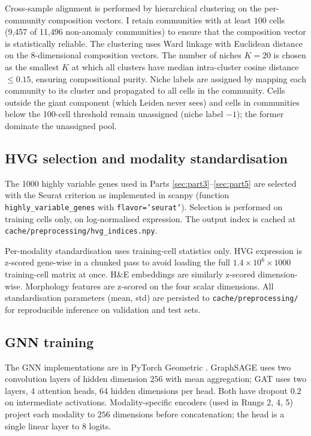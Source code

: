 Cross-sample alignment is performed by hierarchical clustering on the per-community composition vectors. I retain communities with at least $100$ cells (9{,}457 of 11{,}496 non-anomaly communities) to ensure that the composition vector is statistically reliable. The clustering uses Ward linkage \cite{murtagh2014ward} with Euclidean distance on the 8-dimensional composition vectors. The number of niches $K = 20$ is chosen as the smallest $K$ at which all clusters have median intra-cluster cosine distance $\leq 0.15$, ensuring compositional purity. Niche labels are assigned by mapping each community to its cluster and propagated to all cells in the community. Cells outside the giant component (which Leiden never sees) and cells in communities below the 100-cell threshold remain unassigned (niche label $-1$); the former dominate the unassigned pool.

\subsection*{HVG selection and modality standardisation}

The 1000 highly variable genes used in Parts \ref{sec:part3}--\ref{sec:part5} are selected with the Seurat criterion as implemented in scanpy \cite{wolf2018scanpy} (function \texttt{highly\_variable\_genes} with \texttt{flavor='seurat'}). Selection is performed on training cells only, on log-normalised expression. The output index is cached at \texttt{cache/preprocessing/hvg\_indices.npy}.

Per-modality standardisation uses training-cell statistics only. HVG expression is z-scored gene-wise in a chunked pass to avoid loading the full $1.4 \times 10^6 \times 1000$ training-cell matrix at once. H\&E embeddings are similarly z-scored dimension-wise. Morphology features are z-scored on the four scalar dimensions. All standardisation parameters (mean, std) are persisted to \texttt{cache/preprocessing/} for reproducible inference on validation and test sets.

\subsection*{GNN training}

The GNN implementations are in PyTorch Geometric \cite{fey2019pyg}. GraphSAGE uses two convolution layers of hidden dimension $256$ with mean aggregation; GAT uses two layers, $4$ attention heads, $64$ hidden dimensions per head. Both have dropout $0.2$ on intermediate activations. Modality-specific encoders (used in Rungs 2, 4, 5) project each modality to $256$ dimensions before concatenation; the head is a single linear layer to $8$ logits.

